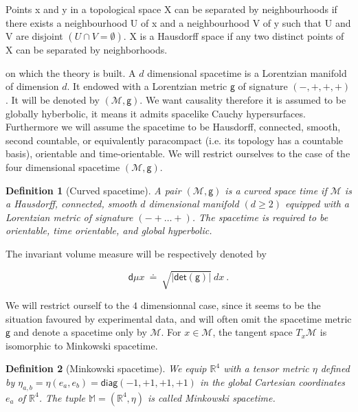 \documentclass[11pt]{book}
\newcommand{\abs}[1]{\left|#1\right|}
\renewcommand{\det}{\mathsf{det}}
\newcommand{\Mcal}{\mathcal{M}}
\newcommand{\Mbb}{\mathbb{M}}
\newcommand{\Rbb}{\mathbb{R}}
\newcommand{\dsf}{\mathsf{d}}
\newcommand{\gsf}{\mathsf{g}}
\theoremstyle{break}
\newtheorem{definition}{Definition}
\begin{document}
Points x and y in a topological space X can be separated by neighbourhoods if there exists a neighbourhood U of x and a neighbourhood V of y such that U and V are disjoint $(U \cap V = \emptyset)$. X is a Hausdorff space if any two distinct points of X can be separated by neighborhoods. 

\bigskip

on which the theory is built. A $d$ dimensional spacetime is a Lorentzian manifold of dimension $d$. It endowed with a Lorentzian metric $\gsf$ of signature $(-,+,+,+)$. It will be denoted by $\left(\Mcal,\gsf\right)$. We want causality therefore it is assumed to be globally hyberbolic, it means it admits spacelike Cauchy hypersurfaces. Furthermore we will assume the spacetime to be Hausdorff, connected, smooth, second countable, or equivalently paracompact (i.e. its topology has a countable basis), orientable and time-orientable. We will restrict ourselves to the case of the four dimensional spacetime $\left(\Mcal,\gsf\right)$.

\bigskip

\begin{definition}[Curved spacetime]
A pair $(\Mcal,\gsf)$ is a curved space time if $\Mcal$ is a Hausdorff, connected, smooth $d$ dimensional manifold $(d \geq 2)$ equipped with a Lorentzian metric of signature $( - + \dots +)$. The spacetime is required to be orientable, time orientable, and global hyperbolic. 
\end{definition}

The invariant volume measure will be respectively denoted by  

\begin{equation*} 
 \dsf\mu x \ \doteq \ \sqrt{\abs{\det(\gsf)}} \ dx \ .
\end{equation*}

We will restrict ourself to the $4$ dimensionnal case, since it seems to be the situation favoured by experimental data, and will often omit the spacetime metric $\gsf$ and denote a spacetime only by $\Mcal$. For $x\in\Mcal$, the tangent space $T_x\Mcal$ is isomorphic to Minkowski spacetime. \par

\begin{definition}[Minkowski spacetime]
We equip $\Rbb^4$ with a tensor metric $\eta$ defined by $\eta_{a,b} = \eta(e_a,e_b) = \mathsf{diag}(-1,+1,+1,+1)$ in the global Cartesian coordinates $e_a$ of $\Rbb^4$. The tuple $\Mbb = \left(\Rbb^4,\eta\right)$ is called Minkowski spacetime. 
\end{definition}
\end{document}

